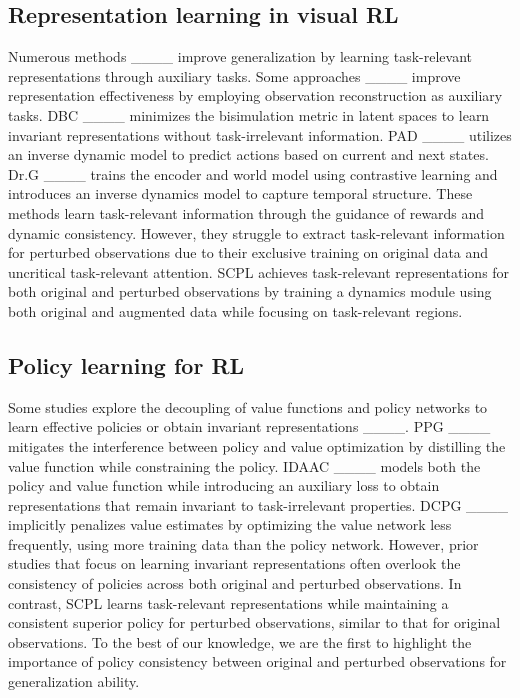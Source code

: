 \subsection{Representation learning in visual RL} 
Numerous methods ____ improve generalization by learning task-relevant representations through auxiliary tasks. 
Some approaches ____ improve representation effectiveness by employing observation reconstruction as auxiliary tasks. 
DBC ____ minimizes the bisimulation metric in latent spaces to learn invariant representations without task-irrelevant information. 
PAD ____ utilizes an inverse dynamic model to predict actions based on current and next states.
Dr.G ____ trains the encoder and world model using contrastive learning and introduces an inverse dynamics model to capture temporal structure.
These methods learn task-relevant information through the guidance of rewards and dynamic consistency.
However, they struggle to extract task-relevant information for perturbed observations due to their exclusive training on original data and uncritical task-relevant attention.
SCPL achieves task-relevant representations for both original and perturbed observations by training a dynamics module using both original and augmented data while focusing on task-relevant regions.

\vspace{-.2cm}
\subsection{Policy learning for RL} 
Some studies explore the decoupling of value functions and policy networks to learn effective policies or obtain invariant representations ____.
PPG ____ mitigates the interference between policy and value optimization by distilling the value function while constraining the policy.
IDAAC ____ models both the policy and value function while introducing an auxiliary loss to obtain representations that remain invariant to task-irrelevant properties.
DCPG ____ implicitly penalizes value estimates by optimizing the value network less frequently, using more training data than the policy network.
However, prior studies that focus on learning invariant representations often overlook the consistency of policies across both original and perturbed observations.
In contrast, SCPL learns task-relevant representations while maintaining a consistent superior policy for perturbed observations, similar to that for original observations.
To the best of our knowledge, we are the first to highlight the importance of policy consistency between original and perturbed observations for generalization ability.


\vspace{-.2cm}